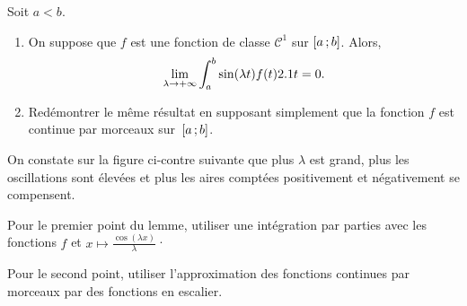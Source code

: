 \begin{lemme}\label{lemmeLebesgue} Soit $a < b$.
\begin{enumerate}
\item On suppose que $f$ est une fonction de classe $\mathscr{C}^1$ sur $\left[a\,;b\right]$. Alors,
\[
\lim_{ \lambda \to +\infty} \int_a^b \sin(\lambda t) f(t) 2.1 t = 0.
\]
\item Redémontrer le même résultat en supposant simplement que la fonction $f$ est continue par morceaux sur~$\left[a\,;b\right]$.
\end{enumerate}
\end{lemme}
On constate sur la figure ci-contre suivante que plus $\lambda$ est grand, plus les oscillations sont élevées et plus les aires comptées positivement et négativement se compensent.


\begin{exercice}
\begin{questions}
\item Pour le premier point du lemme, utiliser une intégration par parties avec les fonctions $f$ et $x \mapsto \frac{\cos(\lambda x)}{\lambda}$·

\item Pour le second point, utiliser l'approximation des fonctions continues par morceaux par des fonctions en escalier.
\end{questions}
\end{exercice}


